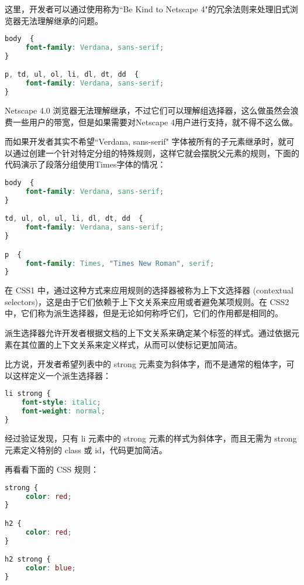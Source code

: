 这里，开发者可以通过使用称为``Be Kind to Netscape 4"的冗余法则来处理旧式浏览器无法理解继承的问题。

\begin{lstlisting}[language=CSS]
body  {
     font-family: Verdana, sans-serif;
}

p, td, ul, ol, li, dl, dt, dd  {
     font-family: Verdana, sans-serif;
}
\end{lstlisting}

Netscape 4.0 浏览器无法理解继承，不过它们可以理解组选择器，这么做虽然会浪费一些用户的带宽，但是如果需要对Netscape 4用户进行支持，就不得不这么做。

而如果开发者其实不希望``Verdana, sans-serif" 字体被所有的子元素继承时，就可以通过创建一个针对特定分组的特殊规则，这样它就会摆脱父元素的规则，下面的代码演示了段落分组使用Times字体的情况：

\begin{lstlisting}[language=CSS]
body  {
     font-family: Verdana, sans-serif;
}

td, ul, ol, ul, li, dl, dt, dd  {
     font-family: Verdana, sans-serif;
}

p  {
     font-family: Times, "Times New Roman", serif;
}
\end{lstlisting}

在 CSS1 中，通过这种方式来应用规则的选择器被称为上下文选择器 (contextual selectors)，这是由于它们依赖于上下文关系来应用或者避免某项规则。在 CSS2 中，它们称为派生选择器，但是无论如何称呼它们，它们的作用都是相同的。

派生选择器允许开发者根据文档的上下文关系来确定某个标签的样式。通过依据元素在其位置的上下文关系来定义样式，从而可以使标记更加简洁。

比方说，开发者希望列表中的 strong 元素变为斜体字，而不是通常的粗体字，可以这样定义一个派生选择器：

\begin{lstlisting}[language=CSS]
li strong {
    font-style: italic;
    font-weight: normal;
}
\end{lstlisting}

经过验证发现，只有 li 元素中的 strong 元素的样式为斜体字，而且无需为 strong 元素定义特别的 class 或 id，代码更加简洁。

再看看下面的 CSS 规则：

\begin{lstlisting}[language=CSS]
strong {
     color: red;
}

h2 {
     color: red;
}

h2 strong {
     color: blue;
}
\end{lstlisting}

